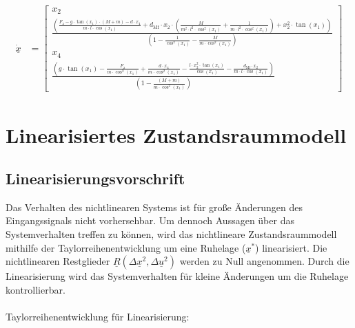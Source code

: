 \documentclass[
	pagesize,
	fontsize=12pt,
	paper=a4,
	oneside,
   reqno
]{scrartcl}
\begin{document}
\begin{align}\label{eq:Gleichung26}
    \dot{\underline{x}} &=
    \begin{bmatrix}
        x_2 \\
        \frac{\left(\frac{F_{\mathrm{a}} - g \cdot \tan(x_{\mathrm{1}}) \cdot (M + m) - d \cdot x_{\mathrm{4}}}{m \cdot l \cdot \cos(x_{\mathrm{1}})} + d_{\mathrm{Mf}} \cdot x_{\mathrm{2}} \cdot \left(\frac{M}{m^2 \cdot l^2 \cdot \cos^2(x_{\mathrm{1}})} + \frac{1}{m \cdot l^2 \cdot \cos^2(x_{\mathrm{1}})}\right) + x_{\mathrm{2}}^2 \cdot \tan(x_{\mathrm{1}})\right)}{\left(1 - \frac{1}{\cos^2(x_{\mathrm{1}})} - \frac{M}{m \cdot \cos^2(x_{\mathrm{1}})}\right)} \\
        x_{\mathrm{4}} \\
        \frac{\left(g \cdot \tan(x_{\mathrm{1}}) - \frac{F_{\mathrm{a}}}{m \cdot \cos^2(x_{\mathrm{1}})} + \frac{d \cdot x_{\mathrm{4}}}{m \cdot \cos^2(x_{\mathrm{1}})} - \frac{l \cdot x_{\mathrm{2}}^2 \cdot \tan(x_{\mathrm{1}})}{\cos(x_{\mathrm{1}})} - \frac{d_{\mathrm{Mf}} \cdot x_{\mathrm{2}}}{m \cdot l \cdot \cos(x_{\mathrm{1}})}\right)}{\left(1 - \frac{(M + m)}{m \cdot \cos^2(x_{\mathrm{1}})}\right)}
    \end{bmatrix}
\end{align}

\clearpage

\section{Linearisiertes Zustandsraummodell}

\subsection{Linearisierungsvorschrift}
Das Verhalten des nichtlinearen Systems ist für große Änderungen des Eingangssignals nicht vorhersehbar. Um dennoch Aussagen über das Systemverhalten treffen zu können, wird das nichtlineare Zustandsraummodell mithilfe der Taylorreihenentwicklung um eine Ruhelage ($\underline{x}^{*}$) linearisiert. Die nichtlinearen Restglieder $\underline{R}(\Delta{\underline{x}^2}, \Delta{\underline{u}^2})$ werden zu Null angenommen.
Durch die Linearisierung wird das Systemverhalten für kleine Änderungen um die Ruhelage kontrollierbar.\\
\\Taylorreihenentwicklung für Linearisierung:
\end{document}
